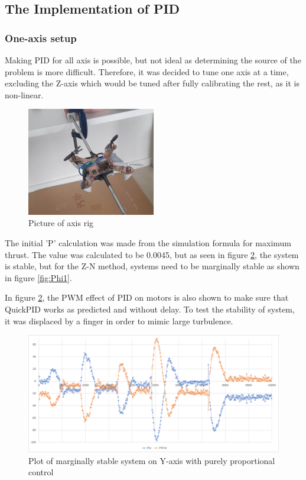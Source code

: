 \subsection{The Implementation of PID}
\subsubsection{One-axis setup}

Making PID for all axis is possible, but not ideal as determining the source of the problem is more difficult. Therefore, it was decided to tune one axis at a time, excluding the Z-axis which would be tuned after fully calibrating the rest, as it is non-linear.

\begin{figure}[h]
    \centering
    \includegraphics[width=0.5\textwidth]{pictures/Axis_rig.jpg}
    \caption{Picture of axis rig}
    \label{fig:axis_rig}
\end{figure}

The initial 'P' calculation was made from the simulation formula for maximum thrust. The value was calculated to be 0.0045, but as seen in figure \ref{fig:Phi0}, the system is stable, but for the Z-N method, systems need to be marginally stable as shown in figure \ref{fig:Phi1}. 

In figure \ref{fig:Phi0}, the PWM effect of PID on motors is also shown to make sure that QuickPID works as predicted and without delay.
To test the stability of system, it was displaced by a finger in order to mimic large turbulence.

\begin{figure}[h!]
    \centering
    \includegraphics[width=\textwidth]{pictures/graphs/PhiP00045.png}
    \caption{Plot of marginally stable system on Y-axis with purely proportional control}
    \label{fig:Phi0}
\end{figure}

